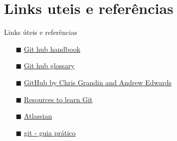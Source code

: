 \documentclass[xcolor=dvipsnames,t]{beamer}
\begin{document}
\section{Links uteis e referências}
\begin{frame}{Links úteis e referências}

	\begin{itemize}		
	\item[$\blacksquare$] \href{https://guides.github.com/introduction/git-handbook/}{\color{blue}Git hub handbook}
	\item[$\blacksquare$] \href{https://help.github.com/articles/github-glossary/}{\color{blue} Git hub glossary}
	\item[$\blacksquare$] \href{https://github.com/pbs-assess/git-course}{\color{blue} GitHub by Chris Grandin and Andrew Edwards}
	\item[$\blacksquare$] \href{https://try.github.io/}{\color{blue} Resources to learn Git}
	\item[$\blacksquare$] \href{https://www.atlassian.com/git}{\color{blue} Atlassian} 			
	\item[$\blacksquare$]  \href{http://rogerdudler.github.io/git-guide/index.pt_BR.html}{\color{blue} git - guia prático} 			
	\end{itemize}
	
%	
\end{frame}
\end{document}
